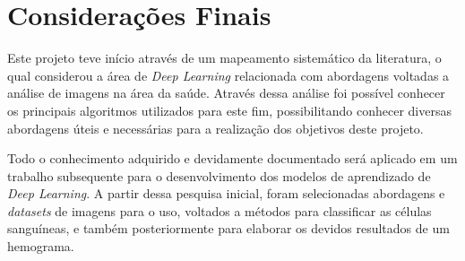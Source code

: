 \chapter{Considerações Finais}
\label{chap:conclusoes}

Este projeto teve início através de um mapeamento sistemático da literatura, o qual considerou a área de \emph{Deep Learning} relacionada com abordagens voltadas a análise de imagens na área da saúde. Através dessa análise foi possível conhecer os principais algoritmos utilizados para este fim, possibilitando conhecer diversas abordagens úteis e necessárias para a realização dos objetivos deste projeto.

Todo o conhecimento adquirido e devidamente documentado será aplicado em um trabalho subsequente para o desenvolvimento dos modelos de aprendizado de \emph{Deep Learning}. A partir dessa pesquisa inicial, foram selecionadas abordagens e \emph{datasets} de imagens para o uso, voltados a métodos para classificar as células sanguíneas, e também posteriormente para elaborar os devidos resultados de um hemograma.